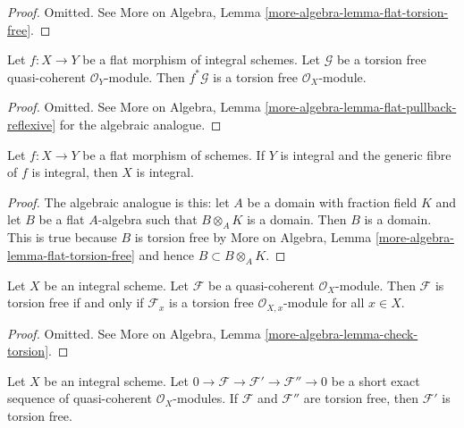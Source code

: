 \begin{proof}
Omitted. See More on Algebra, Lemma \ref{more-algebra-lemma-flat-torsion-free}.
\end{proof}

\begin{lemma}
\label{lemma-flat-pullback-torsion}
Let $f : X \to Y$ be a flat morphism of integral schemes.
Let $\mathcal{G}$ be a torsion free quasi-coherent $\mathcal{O}_Y$-module.
Then $f^*\mathcal{G}$ is a torsion free $\mathcal{O}_X$-module.
\end{lemma}

\begin{proof}
Omitted. See
More on Algebra, Lemma \ref{more-algebra-lemma-flat-pullback-reflexive}
for the algebraic analogue.
\end{proof}

\begin{lemma}
\label{lemma-flat-over-integral-integral-fibre}
Let $f : X \to Y$ be a flat morphism of schemes. If $Y$ is integral
and the generic fibre of $f$ is integral, then $X$ is integral.
\end{lemma}

\begin{proof}
The algebraic analogue is this: let $A$ be a domain with fraction
field $K$ and let $B$ be a flat $A$-algebra such that $B \otimes_A K$
is a domain. Then $B$ is a domain. This is true because $B$ is
torsion free by More on Algebra, Lemma
\ref{more-algebra-lemma-flat-torsion-free}
and hence $B \subset B \otimes_A K$.
\end{proof}

\begin{lemma}
\label{lemma-check-torsion}
Let $X$ be an integral scheme. Let $\mathcal{F}$ be a quasi-coherent
$\mathcal{O}_X$-module. Then $\mathcal{F}$ is torsion free if and only if
$\mathcal{F}_x$ is a torsion free $\mathcal{O}_{X, x}$-module for all $x \in X$.
\end{lemma}

\begin{proof}
Omitted. See More on Algebra, Lemma
\ref{more-algebra-lemma-check-torsion}.
\end{proof}

\begin{lemma}
\label{lemma-extension-torsion-free}
Let $X$ be an integral scheme. Let
$0 \to \mathcal{F} \to \mathcal{F}' \to \mathcal{F}'' \to 0$
be a short exact sequence of quasi-coherent $\mathcal{O}_X$-modules.
If $\mathcal{F}$ and $\mathcal{F}''$ are torsion free, then $\mathcal{F}'$
is torsion free.
\end{lemma}

